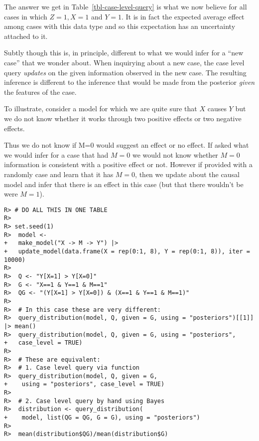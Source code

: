 \documentclass[
  11pt,
  article]{jss}
\begin{document}
\hypertarget{tbl-case-level-query}{}
\begin{table}[!h]
\caption{\label{tbl-case-level-query}Case Level Quiry Example. }\tabularnewline

\centering
{}
\end{table}

The answer we get in Table~\ref{tbl-case-level-query} is what we now
believe for all cases in which \(Z=1, X=1\) and \(Y=1\). It is in fact
the expected average effect among cases with this data type and so this
expectation has an uncertainty attached to it.

Subtly though this is, in principle, different to what we would infer
for a ``new case'' that we wonder about. When inquirying about a new
case, the case level query \emph{updates} on the given information
observed in the new case. The resulting inference is different to the
inference that would be made from the posterior \emph{given} the
features of the case.

To illustrate, consider a model for which we are quite sure that \(X\)
causes \(Y\) but we do not know whether it works through two positive
effects or two negative effects.

Thus we do not know if M=0 would suggest an effect or no effect. If
asked what we would infer for a case that had \(M=0\) we would not know
whether \(M=0\) information is consistent with a positive effect or not.
However if provided with a randomly case and learn that it has \(M=0\),
then we update about the causal model and infer that there is an effect
in this case (but that there wouldn't be were \(M=1\)).

\begin{verbatim}
R> # DO ALL THIS IN ONE TABLE
R> 
R> set.seed(1)
R>  model <-
+   make_model("X -> M -> Y") |>
+   update_model(data.frame(X = rep(0:1, 8), Y = rep(0:1, 8)), iter = 10000)
R> 
R>  Q <- "Y[X=1] > Y[X=0]"
R>  G <- "X==1 & Y==1 & M==1"
R>  QG <- "(Y[X=1] > Y[X=0]) & (X==1 & Y==1 & M==1)"
R> 
R>  # In this case these are very different:
R>  query_distribution(model, Q, given = G, using = "posteriors")[[1]] |> mean()
R>  query_distribution(model, Q, given = G, using = "posteriors",
+   case_level = TRUE)
R> 
R>  # These are equivalent:
R>  # 1. Case level query via function
R>  query_distribution(model, Q, given = G,
+    using = "posteriors", case_level = TRUE)
R> 
R>  # 2. Case level query by hand using Bayes
R>  distribution <- query_distribution(
+    model, list(QG = QG, G = G), using = "posteriors")
R> 
R>  mean(distribution$QG)/mean(distribution$G)
\end{verbatim}
\end{document}
